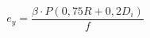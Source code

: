 \documentclass[12pt]{article}
\begin{document}
\begin{displaymath}
e_y = \frac {\beta \cdot P (0,75R + 0,2D_i)} {f}
\end{displaymath}
\end{document}
